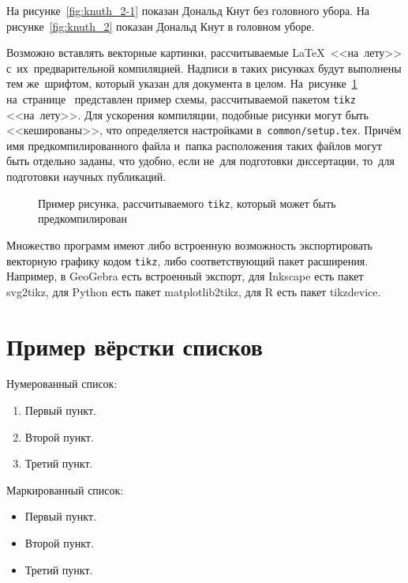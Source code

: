 На рисунке~\ref{fig:knuth_2-1} показан Дональд Кнут без головного убора.
На рисунке~\ref{fig:knuth_2}
показан Дональд Кнут в головном уборе.

Возможно вставлять векторные картинки, рассчитываемые \LaTeX\ <<на~лету>>
с~их~предварительной компиляцией. Надписи в таких рисунках будут выполнены
тем же~шрифтом, который указан для документа в целом.
На~рисунке~\ref{fig:tikz_example} на~странице~\pageref{fig:tikz_example}
представлен пример схемы, рассчитываемой пакетом \verb|tikz| <<на~лету>>.
Для ускорения компиляции, подобные рисунки могут быть <<кешированы>>, что
определяется настройками в~\verb|common/setup.tex|.
Причём имя предкомпилированного
файла и~папка расположения таких файлов могут быть отдельно заданы,
что удобно, если не~для подготовки диссертации,
то~для подготовки научных публикаций.
\begin{figure}[ht]
    \legend{}
    \caption[Пример \texttt{tikz} схемы]{Пример рисунка, рассчитываемого
        \texttt{tikz}, который может быть предкомпилирован}\label{fig:tikz_example}
\end{figure}

Множество программ имеют либо встроенную возможность экспортировать векторную
графику кодом \verb|tikz|, либо соответствующий пакет расширения.
Например, в GeoGebra есть встроенный экспорт,
для Inkscape есть пакет svg2tikz,
для Python есть пакет matplotlib2tikz,
для R есть пакет tikzdevice.

\section{Пример вёрстки списков}\label{sec:ch2/sec3}

\noindent Нумерованный список:
\begin{enumerate}
  \item Первый пункт.
  \item Второй пункт.
  \item Третий пункт.
\end{enumerate}

\noindent Маркированный список:
\begin{itemize}
  \item Первый пункт.
  \item Второй пункт.
  \item Третий пункт.
\end{itemize}

